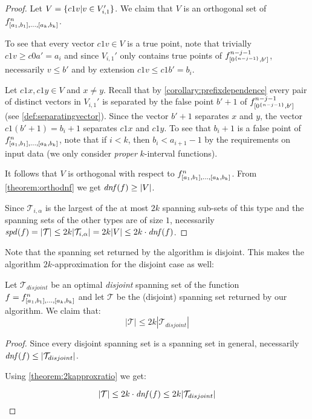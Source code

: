 \begin{proof}
Let $V = \{c1v | v \in V_{i, 1}'\}$.
We claim that $V$ is an orthogonal set of
$f^{n}_{[a_1, b_1], \ldots, [a_{k}, b_{k}]}$.

To see that every vector $c1v \in V$ is a true point,
note that trivially $c1v \geq c0a' = a_i$
and since $V_{i, 1}'$ only contains true points of
$f^{n-j-1}_{[0^{\{n-j-1\}}, b']}$,
necessarily $v \leq b'$
and by extension $c1v \leq c1b' = b_i$.

Let $c1 x, c1 y \in V$
and $x \neq y$.
Recall that by \cref{corollary:prefixdependence}
every pair of distinct vectors in $V_{i, 1}'$
is separated by the false point $b' + 1$
of $f^{n-j-1}_{[0^{\{n-j-1\}}, b']}$
(see \cref{def:separatingvector}).
Since the vector $b'+1$ separates $x$ and $y$,
the vector $c1 (b'+1) = b_i+1$ separates
$c1 x$ and $c1 y$.
To see that $b_i+1$ is a false point of $f^{n}_{[a_1, b_1], \ldots, [a_{k}, b_{k}]}$,
note that if $i<k$,
then $b_i < a_{i+1} - 1$
by the requirements on input data
(we only consider \emph{proper} $k$-interval functions).

It follows that $V$ is orthogonal
with respect to $f^{n}_{[a_1, b_1], \ldots, [a_{k}, b_{k}]}$.
From \cref{theorem:orthodnf} we get
$\mathit{dnf} (f) \geq \lvert V\rvert$.

Since $\mathcal{T}_{i, \alpha}$ is
the largest of the at most $2k$ spanning sub-sets
of this type
and the spanning sets of the other types are of size $1$,
necessarily
$\mathit{spd} (f)
= \lvert\mathcal{T}\rvert
\leq 2k \lvert\mathcal{T}_{i, \alpha}\rvert
= 2k \lvert V\rvert \leq 2k \cdot \mathit{dnf} (f)$.
\end{proof}

Note that the spanning set returned by the algorithm
is disjoint.
This makes the algorithm $2k$-approximation
for the disjoint case as well:

\begin{theorem}
Let $\mathcal{T}_{disjoint}$ be an optimal \emph{disjoint}
spanning set of the function
$f = f^{n}_{[a_1, b_1], \ldots, [a_{k}, b_{k}]}$
and let $\mathcal{T}$ be the (disjoint)
spanning set returned by our algorithm.
We claim that:
\begin{equation*}
|\mathcal{T}| \leq 2k |\mathcal{T}_{disjoint}|
\end{equation*}
\end{theorem}

\begin{proof}
Since every disjoint spanning set
is a spanning set in general,
necessarily
$\mathit{dnf} (f) \leq
\lvert\mathcal{T}_{disjoint}\rvert$.

Using \cref{theorem:2kapproxratio} we get:

\begin{equation*}
|\mathcal{T}| \leq 2k \cdot \mathit{dnf} (f)
\leq 2k |\mathcal{T}_{disjoint}|
\end{equation*}
\end{proof}

